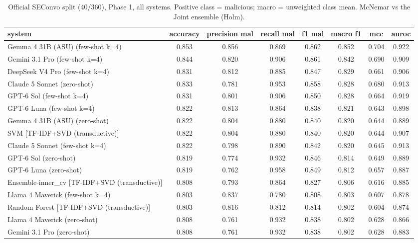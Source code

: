 \begin{table}[htbp]
\centering
\caption{Official SEConvo split (40/360), Phase 1, all systems. Positive class = malicious; macro = unweighted class mean. McNemar vs the Joint ensemble (Holm).}
\label{tab:table1_official_phase1_all}
\small
\begin{tabular}{lccccccc}
\toprule
\textbf{system} & \textbf{accuracy} & \textbf{precision mal} & \textbf{recall mal} & \textbf{f1 mal} & \textbf{macro f1} & \textbf{mcc} & \textbf{auroc} \\
\midrule
Gemma 4 31B (ASU) (few-shot k=4) & 0.853 & 0.856 & 0.869 & 0.862 & 0.852 & 0.704 & 0.922 \\
Gemini 3.1 Pro (few-shot k=4) & 0.844 & 0.820 & 0.906 & 0.861 & 0.842 & 0.690 & 0.909 \\
DeepSeek V4 Pro (few-shot k=4) & 0.831 & 0.812 & 0.885 & 0.847 & 0.829 & 0.661 & 0.906 \\
Claude 5 Sonnet (zero-shot) & 0.833 & 0.781 & 0.953 & 0.858 & 0.828 & 0.680 & 0.913 \\
GPT-6 Sol (few-shot k=4) & 0.831 & 0.801 & 0.906 & 0.850 & 0.828 & 0.664 & 0.919 \\
GPT-6 Luna (few-shot k=4) & 0.822 & 0.813 & 0.864 & 0.838 & 0.821 & 0.643 & 0.898 \\
Gemma 4 31B (ASU) (zero-shot) & 0.822 & 0.804 & 0.880 & 0.840 & 0.820 & 0.644 & 0.889 \\
SVM [TF-IDF+SVD (transductive)] & 0.822 & 0.804 & 0.880 & 0.840 & 0.820 & 0.644 & 0.907 \\
Claude 5 Sonnet (few-shot k=4) & 0.822 & 0.798 & 0.890 & 0.842 & 0.820 & 0.645 & 0.913 \\
GPT-6 Sol (zero-shot) & 0.819 & 0.774 & 0.932 & 0.846 & 0.814 & 0.649 & 0.889 \\
GPT-6 Luna (zero-shot) & 0.819 & 0.762 & 0.958 & 0.849 & 0.812 & 0.657 & 0.887 \\
Ensemble-inner\_cv [TF-IDF+SVD (transductive)] & 0.808 & 0.793 & 0.864 & 0.827 & 0.806 & 0.616 & 0.885 \\
Llama 4 Maverick (few-shot k=4) & 0.803 & 0.837 & 0.780 & 0.808 & 0.803 & 0.607 & 0.878 \\
Random Forest [TF-IDF+SVD (transductive)] & 0.803 & 0.816 & 0.812 & 0.814 & 0.802 & 0.604 & 0.874 \\
Llama 4 Maverick (zero-shot) & 0.808 & 0.761 & 0.932 & 0.838 & 0.802 & 0.628 & 0.866 \\
Gemini 3.1 Pro (zero-shot) & 0.808 & 0.761 & 0.932 & 0.838 & 0.802 & 0.628 & 0.883 \\

\end{tabular}
\end{table}
